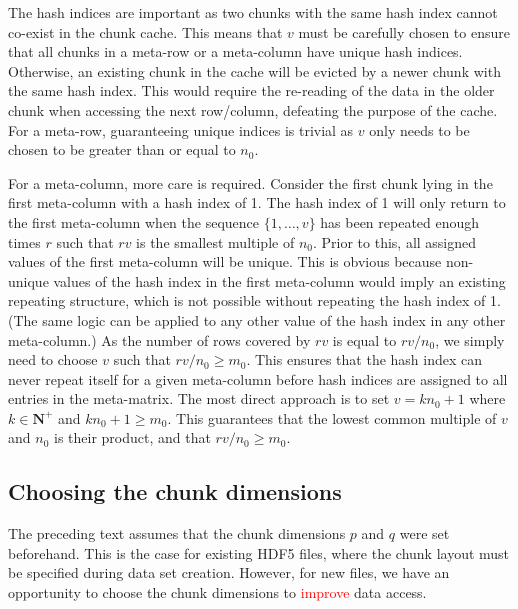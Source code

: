 \documentclass{article}
\newcommand{\revised}[1]{\textcolor{red}{#1}}
\begin{document}
The hash indices are important as two chunks with the same hash index cannot co-exist in the chunk cache.
This means that $v$ must be carefully chosen to ensure that all chunks in a meta-row or a meta-column have unique hash indices.
Otherwise, an existing chunk in the cache will be evicted by a newer chunk with the same hash index.
This would require the re-reading of the data in the older chunk when accessing the next row/column, defeating the purpose of the cache.
For a meta-row, guaranteeing unique indices is trivial as $v$ only needs to be chosen to be greater than or equal to $n_0$.

For a meta-column, more care is required.
Consider the first chunk lying in the first meta-column with a hash index of 1.
The hash index of 1 will only return to the first meta-column when the sequence $\{1, \ldots, v\}$ has been repeated enough times $r$ such that $rv$ is the smallest multiple of $n_0$.
Prior to this, all assigned values of the first meta-column will be unique.
This is obvious because non-unique values of the hash index in the first meta-column would imply an existing repeating structure, which is not possible without repeating the hash index of 1.
(The same logic can be applied to any other value of the hash index in any other meta-column.)
As the number of rows covered by $rv$ is equal to $rv/n_0$, we simply need to choose $v$ such that $rv/n_0 \ge m_0$.
This ensures that the hash index can never repeat itself for a given meta-column before hash indices are assigned to all entries in the meta-matrix.
The most direct approach is to set $v = kn_0 + 1$  where $k \in \mathbf{N}^+$ and $kn_0 +1 \ge m_0$.
This guarantees that the lowest common multiple of $v$ and $n_0$ is their product, and that $rv/n_0 \ge m_0$.


\subsection{Choosing the chunk dimensions}
The preceding text assumes that the chunk dimensions $p$ and $q$ were set beforehand.
This is the case for existing HDF5 files, where the chunk layout must be specified during data set creation.
However, for new files, we have an opportunity to choose the chunk dimensions to \revised{improve} data access.
\end{document}
